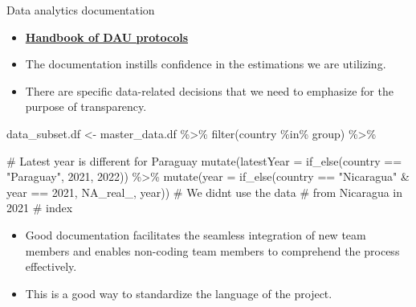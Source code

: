 \documentclass[
  ignorenonframetext,
]{beamer}
\newenvironment{Shaded}{\begin{snugshade}}{\end{snugshade}}
\newcommand{\AttributeTok}[1]{\textcolor[rgb]{0.40,0.45,0.13}{#1}}
\newcommand{\CommentTok}[1]{\textcolor[rgb]{0.37,0.37,0.37}{#1}}
\newcommand{\ConstantTok}[1]{\textcolor[rgb]{0.56,0.35,0.01}{#1}}
\newcommand{\DecValTok}[1]{\textcolor[rgb]{0.68,0.00,0.00}{#1}}
\newcommand{\FunctionTok}[1]{\textcolor[rgb]{0.28,0.35,0.67}{#1}}
\newcommand{\NormalTok}[1]{\textcolor[rgb]{0.00,0.23,0.31}{#1}}
\newcommand{\OtherTok}[1]{\textcolor[rgb]{0.00,0.23,0.31}{#1}}
\newcommand{\SpecialCharTok}[1]{\textcolor[rgb]{0.37,0.37,0.37}{#1}}
\newcommand{\StringTok}[1]{\textcolor[rgb]{0.13,0.47,0.30}{#1}}
\providecommand{\tightlist}{%
  \setlength{\itemsep}{0pt}\setlength{\parskip}{0pt}}\usepackage{longtable,booktabs,array}
\begin{document}
\begin{frame}[fragile]{Data analytics documentation}
\protect\hypertarget{data-analytics-documentation}{}
\begin{itemize}
\tightlist
\item
  \href{https://ctoruno.quarto.pub/wjp-r-handbook/coding.html}{\textbf{Handbook
  of DAU protocols}}
\item
  The documentation instills confidence in the estimations we are
  utilizing.
\item
  There are specific data-related decisions that we need to emphasize
  for the purpose of transparency.
\end{itemize}

\begin{Shaded}
\begin{Highlighting}[]
\NormalTok{  data\_subset.df }\OtherTok{\textless{}{-}}\NormalTok{ master\_data.df }\SpecialCharTok{\%\textgreater{}\%}
    \FunctionTok{filter}\NormalTok{(country }\SpecialCharTok{\%in\%}\NormalTok{ group) }\SpecialCharTok{\%\textgreater{}\%}
    
    \CommentTok{\# Latest year is different for Paraguay}
    \FunctionTok{mutate}\NormalTok{(}\AttributeTok{latestYear =} \FunctionTok{if\_else}\NormalTok{(country }\SpecialCharTok{==} \StringTok{"Paraguay"}\NormalTok{, }\DecValTok{2021}\NormalTok{, }\DecValTok{2022}\NormalTok{)) }\SpecialCharTok{\%\textgreater{}\%}
    \FunctionTok{mutate}\NormalTok{(}\AttributeTok{year =} \FunctionTok{if\_else}\NormalTok{(country }\SpecialCharTok{==} \StringTok{"Nicaragua"} \SpecialCharTok{\&}\NormalTok{ year }\SpecialCharTok{==} \DecValTok{2021}\NormalTok{, }\ConstantTok{NA\_real\_}\NormalTok{, year)) }\CommentTok{\# We didn\textquotesingle{}t use the data }
                                                                                  \CommentTok{\# from Nicaragua in 2021}
                                                                                  \CommentTok{\# index}
\end{Highlighting}
\end{Shaded}

\begin{itemize}
\item
  Good documentation facilitates the seamless integration of new team
  members and enables non-coding team members to comprehend the process
  effectively.
\item
  This is a good way to standardize the language of the project.
\end{itemize}
\end{frame}
\end{document}
